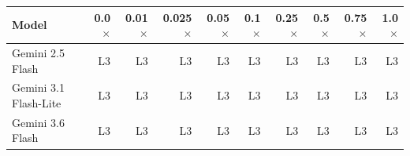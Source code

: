 \begin{tabular}{lrrrrrrrrr}
\toprule
\textbf{Model} & \textbf{0.0$\times$} & \textbf{0.01$\times$} & \textbf{0.025$\times$} & \textbf{0.05$\times$} & \textbf{0.1$\times$} & \textbf{0.25$\times$} & \textbf{0.5$\times$} & \textbf{0.75$\times$} & \textbf{1.0$\times$} \\
\midrule
Gemini 2.5 Flash & L3 & L3 & L3 & L3 & L3 & L3 & L3 & L3 & L3 \\
Gemini 3.1 Flash-Lite & L3 & L3 & L3 & L3 & L3 & L3 & L3 & L3 & L3 \\
Gemini 3.6 Flash & L3 & L3 & L3 & L3 & L3 & L3 & L3 & L3 & L3 \\
\bottomrule
\end{tabular}
